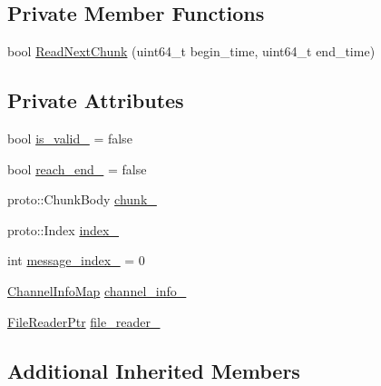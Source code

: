 \subsection*{Private Member Functions}
\begin{DoxyCompactItemize}
\item 
bool \hyperlink{classapollo_1_1cyber_1_1record_1_1RecordReader_a5ee21479dcfbf60ee126a18a9481b0b4}{Read\-Next\-Chunk} (uint64\-\_\-t begin\-\_\-time, uint64\-\_\-t end\-\_\-time)
\end{DoxyCompactItemize}
\subsection*{Private Attributes}
\begin{DoxyCompactItemize}
\item 
bool \hyperlink{classapollo_1_1cyber_1_1record_1_1RecordReader_a7b09eca07e6b20666b8a7b260c528a60}{is\-\_\-valid\-\_\-} = false
\item 
bool \hyperlink{classapollo_1_1cyber_1_1record_1_1RecordReader_a16344f4c5f6fd93fdc159adf7dcd433c}{reach\-\_\-end\-\_\-} = false
\item 
proto\-::\-Chunk\-Body \hyperlink{classapollo_1_1cyber_1_1record_1_1RecordReader_a2673e36c9e33db44fddb73daf8d284e5}{chunk\-\_\-}
\item 
proto\-::\-Index \hyperlink{classapollo_1_1cyber_1_1record_1_1RecordReader_ae635c9dafdc75111943a91e468c91cd1}{index\-\_\-}
\item 
int \hyperlink{classapollo_1_1cyber_1_1record_1_1RecordReader_abd93e0d06b76c3551a60e6d1dbe3e618}{message\-\_\-index\-\_\-} = 0
\item 
\hyperlink{classapollo_1_1cyber_1_1record_1_1RecordReader_a3eb18b9cfa2630f3e4680e89d4ac50be}{Channel\-Info\-Map} \hyperlink{classapollo_1_1cyber_1_1record_1_1RecordReader_a944ca769f9707697dc6efeca9b27eab6}{channel\-\_\-info\-\_\-}
\item 
\hyperlink{classapollo_1_1cyber_1_1record_1_1RecordReader_a99d60a127dc557823804ea7a38f2b337}{File\-Reader\-Ptr} \hyperlink{classapollo_1_1cyber_1_1record_1_1RecordReader_ae87637a1484db67ccdff1f970ae7d317}{file\-\_\-reader\-\_\-}
\end{DoxyCompactItemize}
\subsection*{Additional Inherited Members}


